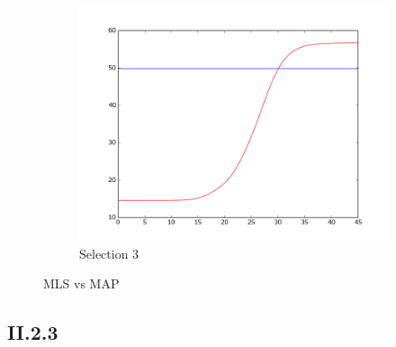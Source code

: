 \documentclass{article}
\begin{document}
\begin{figure}[!ht]
\begin{subfigure}[b]{0.4\textwidth}
        \includegraphics[width=\textwidth]{Part2/II223.png}
        \caption{Selection 3}
    \end{subfigure}
    \caption{MLS vs MAP}
    \label{fig:II22}
\end{figure}




\subsection{II.2.3}
\end{document}
